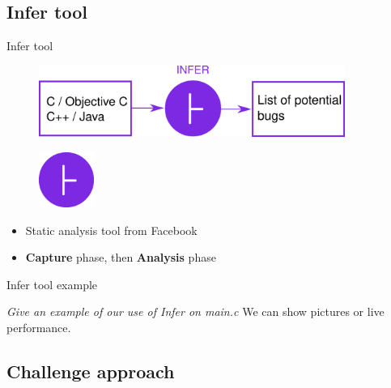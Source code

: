 \documentclass{beamer}
\begin{document}
\subsection{Infer tool}

\begin{frame}{Infer tool}

\begin{figure}
\includegraphics[width=10cm]{Figures/InferDrawing.png}
\end{figure}

\end{frame}

\begin{frame}

\begin{figure}
\includegraphics[width = 1.8cm]{Figures/InferLogo.png}

\end{figure}

\vspace{1cm}

\begin{itemize}
\item Static analysis tool from Facebook
\item \textbf{Capture} phase, then \textbf{Analysis} phase
\end{itemize}

\end{frame}

\begin{frame}{Infer tool example}

\textit{Give an example of our use of Infer on main.c}
We can show pictures or live performance.
\end{frame}

\subsection{Challenge approach}
\end{document}
